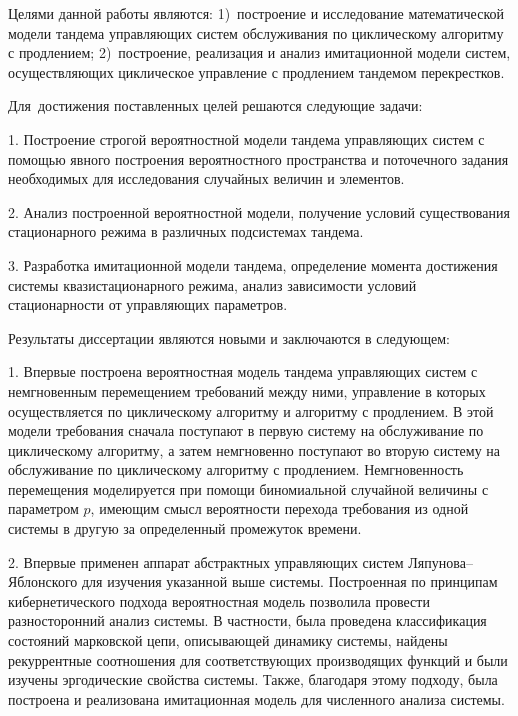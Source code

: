 {\aim} Целями данной работы являются: 1)~построение и исследование математической модели тандема управляющих систем обслуживания по циклическому алгоритму с продлением; 2)~построение, реализация и анализ имитационной модели систем, осуществляющих циклическое управление с продлением тандемом перекрестков.

Для~достижения поставленных целей решаются следующие задачи:

1. Построение строгой вероятностной модели тандема управляющих систем с помощью явного построения вероятностного пространства и поточечного задания необходимых для исследования случайных величин и элементов.

2. Анализ построенной вероятностной модели, получение условий существования стационарного режима в различных подсистемах тандема.

3. Разработка имитационной модели тандема, определение момента достижения системы квазистационарного режима, анализ зависимости условий стационарности от управляющих параметров.



{\novelty} Результаты диссертации являются новыми и заключаются в следующем:

1. Впервые построена вероятностная модель тандема управляющих систем с немгновенным перемещением требований между ними, управление в которых осуществляется по циклическому алгоритму и алгоритму с продлением. В этой модели требования сначала поступают в первую систему на обслуживание по циклическому алгоритму, а затем немгновенно поступают во вторую систему на обслуживание по циклическому алгоритму с продлением. Немгновенность перемещения моделируется при помощи биномиальной случайной величины с параметром $p$, имеющим смысл вероятности перехода требования из одной системы в другую за определенный промежуток времени.

2. Впервые применен аппарат абстрактных управляющих систем Ляпунова--Яблонского для изучения указанной выше системы. Построенная по принципам кибернетического подхода вероятностная модель позволила провести разносторонний анализ системы. В частности, была проведена классификация состояний марковской цепи, описывающей динамику системы, найдены рекуррентные соотношения для соответствующих производящих функций и были изучены эргодические свойства системы. Также, благодаря этому подходу, была построена и реализована имитационная модель для численного анализа системы.

